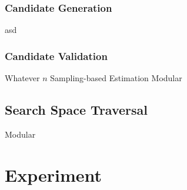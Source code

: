 \subsubsection{Candidate Generation}
asd
\subsubsection{Candidate Validation}

  Whatever $n$
Sampling-based Estimation
\sampling Modular

\begin{example}
\end{example}

\subsection{Search Space Traversal} \label{ssec:traversal}
\traversal Modular



\begin{example}
\end{example}
\section{Experiment}
\label{sec:exp}








